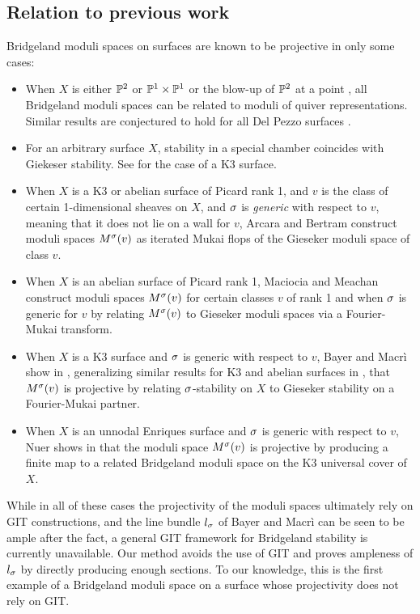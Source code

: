\documentclass[letterpaper,12pt]{amsart}
\theoremstyle{remark}
\begin{document}
\subsection*{Relation to previous work}
Bridgeland moduli spaces on surfaces are known to be projective in only some cases:
\begin{itemize}
    \item When $X$ is either $\mathbb{P}^2$ \cite{ABCH} or $\mathbb{P}^1 \times \mathbb{P}^1$ or the blow-up of $\mathbb{P}^2$ at a point \cite{AM}, all Bridgeland moduli spaces can be related to moduli of quiver representations. Similar results are conjectured to hold for all Del Pezzo surfaces \cite{AM}.
    
    \item For an arbitrary surface $X$, stability in a special chamber coincides with Giekeser stability. See \cite{bridgelandK3} for the case of a K3 surface.
    
    \item When $X$ is a K3 or abelian surface of Picard rank 1, and $v$ is the class of certain 1-dimensional sheaves on $X$, and $\sigma$ is \textit{generic} with respect to $v$, meaning that it does not lie on a wall for $v$, Arcara and Bertram \cite{ABL13} construct moduli spaces $M^\sigma(v)$ as iterated Mukai flops of the Gieseker moduli space of class $v$.
    
    \item When $X$ is an abelian surface of Picard rank 1, Maciocia and Meachan \cite{MM} construct moduli spaces $M^\sigma(v)$ for certain classes $v$ of rank 1 and when $\sigma$ is generic for $v$ by relating $M^\sigma(v)$ to Gieseker moduli spaces via a Fourier-Mukai transform.
    
    \item When $X$ is a K3 surface and $\sigma$ is generic with respect to $v$, Bayer and Macr\`i show in \cite{BM}, generalizing similar results for K3 and abelian surfaces in \cite{mmy}, that $M^\sigma(v)$ is projective by relating $\sigma$-stability on $X$ to Gieseker stability on a Fourier-Mukai partner.
    
    \item When $X$ is an unnodal Enriques surface and $\sigma$ is generic with respect to $v$, Nuer shows in \cite{nuer} that the moduli space $M^\sigma(v)$ is projective by producing a finite map to a related Bridgeland moduli space on the K3 universal cover of $X$.
    
\end{itemize} 
While in all of these cases the projectivity of the moduli spaces ultimately rely on GIT constructions, and the line bundle $l_\sigma$ of Bayer and Macr\`i can be seen to be ample after the fact, a general GIT framework for Bridgeland stability is currently unavailable. Our method avoids the use of GIT and proves ampleness of $l_\sigma$ by directly producing enough sections. To our knowledge, this is the first example of a Bridgeland moduli space on a surface whose projectivity does not rely on GIT.
\end{document}
